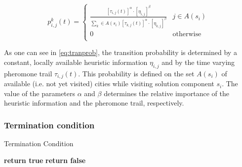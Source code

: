 \begin{homeworkProblem}
\begin{equation} 
p_{i,j}^k(t) = \begin{cases}
  \frac{[\tau_{i,j}(t)]^\alpha \cdot [\eta_{i,j}]^\beta}{\sum_{k} \in A(s_{i}) [\tau_{k,j}(t)]^\alpha \cdot [\eta_{k,j}]^\beta} & j \in A(s_{i}) \\
 0 & \text{otherwise} \\
\end{cases}
\end{equation}

As one can see in \ref{eq:tranprob}, the transition probability is determined by a constant, locally available heuristic information $\eta_{i,j}$ and by the time varying pheromone trail $\tau_{i,j}(t)$.
This probability is defined on the set $A(s_i)$ of available (i.e. not yet visited) cities while visiting solution component $s_i$.
The value of the parameters $\alpha$ and $\beta$ determines the relative importance of the heuristic information and the pheromone trail, respectively.

\subsubsection{Termination condition}
\begin{algorithm}[!h]
  \caption{Termination Condition}\label{termcond}
  \begin{algorithmic}[1]
				    \State \textbf{return true}
			    \EndIf
      \State \textbf{return false}
    \EndProcedure
\end{algorithmic}
\end{algorithm}

 
\end{homeworkProblem}
